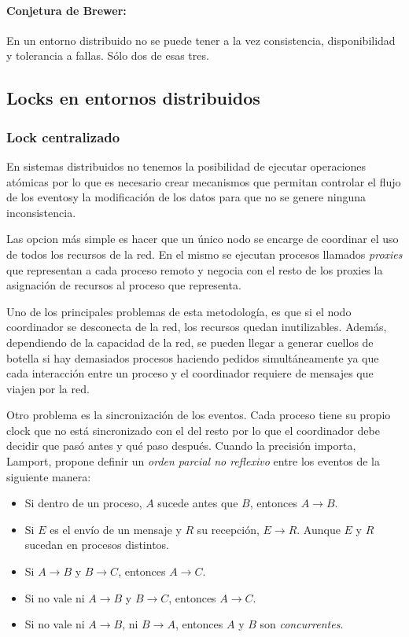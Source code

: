 \paragraph{Conjetura de Brewer:} En un entorno distribuido no se puede tener a la vez consistencia, disponibilidad y tolerancia a fallas. Sólo dos de esas tres.

\subsection{Locks en entornos distribuidos}
\subsubsection{Lock centralizado}
En sistemas distribuidos no tenemos la posibilidad de ejecutar operaciones atómicas por lo que es necesario crear mecanismos que permitan controlar el flujo de los eventosy la modificación de los datos para que no se genere ninguna inconsistencia.

Las opcion más simple es hacer que un único nodo se encarge de coordinar el uso de todos los recursos de la red. En el mismo se ejecutan procesos llamados \textit{proxies} que representan a cada proceso remoto y negocia con el resto de los proxies la asignación de recursos al proceso que representa.

Uno de los principales problemas de esta metodología, es que si el nodo coordinador se desconecta de la red, los recursos quedan inutilizables. Además, dependiendo de la capacidad de la red, se pueden llegar a generar cuellos de botella si hay demasiados procesos haciendo pedidos simultáneamente ya que cada interacción entre un proceso y el coordinador requiere de mensajes que viajen por la red.

Otro problema es la sincronización de los eventos. Cada proceso tiene su propio clock que no está sincronizado con el del resto por lo que el coordinador debe decidir que pasó antes y qué paso después. Cuando la precisión importa, Lamport, propone definir un \textit{orden parcial no reflexivo} entre los eventos de la siguiente manera:
\begin{itemize}
	\item Si dentro de un proceso, $A$ sucede antes que $B$, entonces $A \rightarrow B$.
	\item Si $E$ es el envío de un mensaje y $R$ su recepción, $E \rightarrow R$. Aunque $E$ y $R$ sucedan en procesos distintos.
	\item Si $A \rightarrow B$ y $B \rightarrow C$, entonces $A \rightarrow C$.
	\item Si no vale ni $A \rightarrow B$ y $B \rightarrow C$, entonces $A \rightarrow C$.
	\item Si no vale ni $A \rightarrow B$, ni $B \rightarrow A$, entonces $A$ y $B$ son \textit{concurrentes}.
\end{itemize}

